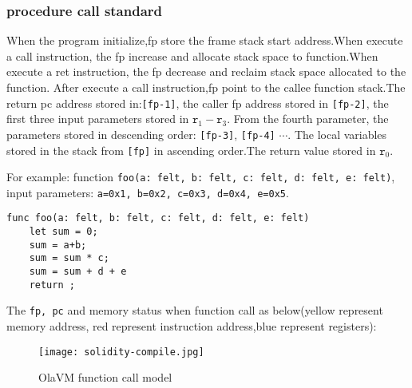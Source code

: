 \subsubsection{procedure call standard}\label{subsec: processor-instructions-executor-abi}

When the program initialize,fp store the frame stack start address.When execute a call instruction, the fp increase and allocate stack space to function.When execute a ret instruction, the fp decrease and reclaim stack space allocated to the function.
After execute a call instruction,fp point to the callee function stack.The return pc address stored in:\texttt{[fp-1]}, the caller fp address stored in \texttt{[fp-2]}, the first three input parameters stored in $\texttt{r}_1 - \texttt{r}_{3}$.
From the fourth parameter, the parameters stored in descending order: \texttt{[fp-3]}, \texttt{[fp-4]} $\cdots$.
The local variables stored in the stack from \texttt{[fp]} in ascending order.The return value stored in $\texttt{r}_0$.

For example: function \texttt{foo(a: felt, b: felt, c: felt, d: felt, e: felt)}, input parameters: \texttt{a=0x1, b=0x2, c=0x3, d=0x4, e=0x5}.
\begin{lstlisting}[label={lst:function_call}]
func foo(a: felt, b: felt, c: felt, d: felt, e: felt)
    let sum = 0;
    sum = a+b;
    sum = sum * c;
    sum = sum + d + e
    return ;
\end{lstlisting}

The \texttt{fp, pc} and memory status when function call as below(yellow represent memory address, red represent instruction address,blue represent registers):
\begin{figure}[!htp]
    \centering
    \texttt{[image: solidity-compile.jpg]}
    \caption{OlaVM function call model}
    \label{fig:processor call}
\end{figure}
